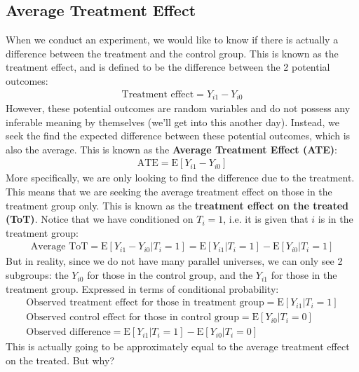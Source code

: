 \documentclass{article}
\begin{document}
\subsection{Average Treatment Effect}
When we conduct an experiment, we would like to know if there is actually a difference between the treatment and the control group.
This is known as the treatment effect, and is defined to be the difference between the 2 potential outcomes:
\begin{gather*}
    \text{Treatment effect} = Y_{i1} - Y_{i0}
\end{gather*}
However, these potential outcomes are random variables and do not possess any inferable meaning by themselves (we'll get into this another day). 
Instead, we seek the find the expected difference between these potential outcomes, which is also the average. 
This is known as the \textbf{Average Treatment Effect (ATE)}:
\begin{gather*}
    \text{ATE} = \text{E}[Y_{i1} - Y_{i0}]
\end{gather*}
More specifically, we are only looking to find the difference due to the treatment. 
This means that we are seeking the average treatment effect on those in the treatment group only. 
This is known as the \textbf{treatment effect on the treated (ToT)}.
Notice that we have conditioned on $T_i=1$, i.e. it is given that $i$ is in the treatment group:
\begin{gather*}
    \text{Average ToT} = \text{E}[Y_{i1} - Y_{i0} | T_i = 1] = \text{E}[Y_{i1} | T_i = 1] - \text{E}[Y_{i0} | T_i = 1] %
\end{gather*}
But in reality, since we do not have many parallel universes, we can only see 2 subgroups: the $Y_{i0}$ for those in the control group, and the $Y_{i1}$ for those in the treatment group.
Expressed in terms of conditional probability:
\begin{gather*}
    \text{Observed treatment effect for those in treatment group} = \text{E}[Y_{i1}|T_i = 1]\\
    \text{Observed control effect for those in control group} = \text{E}[Y_{i0}|T_i = 0]\\
    \text{Observed difference} = \text{E}[Y_{i1}|T_i = 1] - \text{E}[Y_{i0}|T_i = 0]
\end{gather*}
This is actually going to be approximately equal to the average treatment effect on the treated. 
But why?
\end{document}
